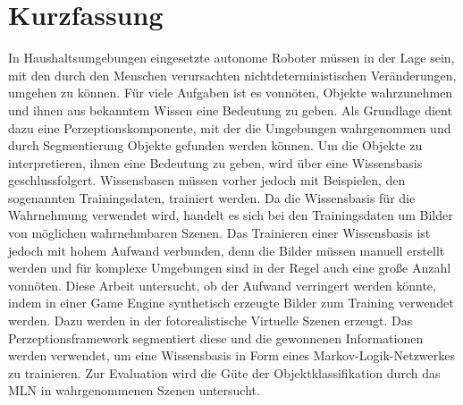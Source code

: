 \chapter*{Kurzfassung} 

In Haushaltsumgebungen eingesetzte autonome Roboter müssen in der Lage sein, mit den durch den Menschen verursachten nichtdeterministischen Veränderungen, umgehen zu können. Für viele Aufgaben ist es vonnöten, Objekte wahrzunehmen und ihnen aus bekanntem Wissen eine Bedeutung zu geben. Als Grundlage dient dazu eine Perzeptionskomponente, mit der die Umgebungen wahrgenommen und durch Segmentierung Objekte gefunden werden können. Um die Objekte zu interpretieren, ihnen eine Bedeutung zu geben, wird über eine Wissensbasis geschlussfolgert. Wissensbasen müssen vorher jedoch mit Beispielen, den sogenannten Trainingsdaten, trainiert werden. Da die Wissensbasis für die Wahrnehmung verwendet wird, handelt es sich bei den Trainingsdaten um Bilder von möglichen wahrnehmbaren Szenen. Das Trainieren einer Wissensbasis ist jedoch mit hohem Aufwand verbunden, denn die Bilder müssen manuell erstellt werden und für komplexe Umgebungen sind in der Regel auch eine große Anzahl vonnöten. Diese Arbeit untersucht, ob der Aufwand verringert werden könnte, indem in einer Game Engine synthetisch erzeugte Bilder zum Training verwendet werden. Dazu werden in der \unreal fotorealistische Virtuelle Szenen erzeugt. Das Perzeptionsframework \robosherlock segmentiert diese und die gewonnenen Informationen werden verwendet, um eine Wissensbasis in Form eines Markov-Logik-Netzwerkes zu trainieren. Zur Evaluation wird die Güte der Objektklassifikation durch das MLN in wahrgenommenen Szenen untersucht. 

